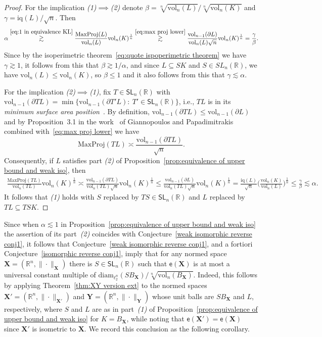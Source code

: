 \documentclass[11pt,reqno]{amsart}
\renewcommand{\le}{\leqslant}
\newcommand{\diam}{\mathrm{diam}}
\newcommand{\X}{\mathbf X}
\newcommand{\Y}{\mathbf Y}
\newcommand{\R}{\mathbb R}
\theoremstyle{remark}
\newcommand{\iq}{\mathrm{iq}}
\newcommand{\SL}{\mathsf{SL}}
\renewcommand{\subset}{\subseteq}
\newcommand{\ee}{\mathsf{e}}
\newcommand{\vol}{\mathrm{vol}}
\renewcommand{\1}{\mathbf 1}
\begin{document}
\begin{proof} For the implication {\em (1)}$\implies${\em (2)} denote $\beta=\sqrt[n]{\vol_n(L)}/\sqrt[n]{\vol_n(K)}$ and $\gamma=\iq(L)/\sqrt{n}$. Then
$$
\alpha\stackrel{\eqref{eq:1 in equivalence KL}}{\gtrsim} \frac{\mathrm{MaxProj}(L)}{\vol_n(L)}\vol_n(K)^{\frac{1}{n}}\stackrel{\eqref{eq:max proj lower}}{\gtrsim} \frac{\vol_{n-1}(\partial L)}{\vol_n(L)\sqrt{n}}\vol_n(K)^{\frac{1}{n}}=\frac{\gamma}{\beta}.
$$
Since by the isoperimetric theorem~\eqref{eq:quote ispoperimetric theorem} we have $\gamma\gtrsim 1$, it follows from this that $\beta\gtrsim 1/\alpha$, and since $L\subset S K$ and $S\in SL_n(\R)$, we have $\vol_n(L)\le \vol_n(K)$, so $\beta\le 1$ and it also follows from this that $\gamma\lesssim \alpha$.

For the implication {\em (2)}$\implies${\em (1)}, fix $T\in \SL_n(\R)$ with $\vol_{n-1}(\partial TL)=\min\{\vol_{n-1}(\partial T'L):\ T'\in \SL_n(\R)\}$,
 i.e., $TL$ is in its {\em minimum surface area position}~\cite{Pet61}. By definition, $\vol_{n-1}(\partial T L)\le \vol_{n-1}(\partial L)$   and  by Proposition~3.1 in the work~\cite{GP99} of Giannopoulos and Papadimitrakis combined with~\eqref{eq:max proj lower} we have $$\mathrm{MaxProj}(T L)\asymp \frac{\vol_{n-1}(\partial T L)}{\sqrt{n}}.$$ Consequently, if $L$ satisfies part  {\em (2)} of Proposition~\ref{prop:equivalence of upper bound and weak iso}, then
\begin{multline*}
\frac{\mathrm{MaxProj}(TL)}{\vol_n(TL)}\vol_n(K)^{\frac{1}{n}}\asymp \frac{\vol_{n-1}(\partial T L)}{\vol_n(TL)\sqrt{n}}\vol_n(K)^{\frac{1}{n}}\le  \frac{\vol_{n-1}(\partial L)}{\vol_n(TL)\sqrt{n}}\vol_n(K)^{\frac{1}{n}}=\frac{\iq(L)}{\sqrt{n}}\bigg(\frac{\vol_n(K)}{\vol_n(L)}\bigg)^{\frac{1}{n}}
\le\frac{\gamma}{\beta}\lesssim \alpha.
\end{multline*}
It follows that {\em (1)} holds with $S$ replaced by $TS\in \SL_n(\R)$ and $L$ replaced by $TL\subset TSK$.
\end{proof}



Since when $\alpha\lesssim 1$ in Proposition~\ref{prop:equivalence of upper bound and weak iso} the assertion of its part~{\em (2)}  coincides with Conjecture~\ref{weak isomorphic reverse conj1}, it follows that Conjecture~\ref{weak isomorphic reverse conj1}, and a fortiori Conjecture~\ref{isomorphic reverse conj1}, imply that for any normed space $\X=(\R^n,\|\cdot\|_\X)$ there is   $S\in \SL_n(\R)$ such that $\ee(\X)$ is at most a universal constant multiple of $\diam_{\ell_2^n}(S B_\X)/\sqrt[n]{\vol_n(B_\X)}$. Indeed, this follows by applying Theorem~\ref{thm:XY version ext}  to the normed spaces $\X'=(\R^n,\|\cdot\|_{\X'})$ and $\Y=(\R^n,\|\cdot\|_\Y)$ whose unit balls are $SB_\X$ and $L$, respectively, where $S$ and $L$ are as in part~{\em (1)} of Proposition~\ref{prop:equivalence of upper bound and weak iso} for $K=B_\X$, while noting that $\ee(\X')=\ee(\X)$ since $\X'$ is isometric to $\X$. We record this conclusion as the following corollary.
\end{document}
